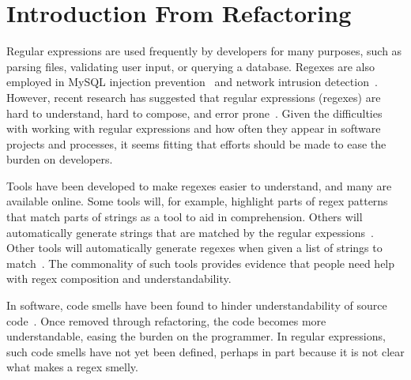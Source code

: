 \section{Introduction From Refactoring}

Regular expressions are used frequently by developers for many purposes, such as parsing files, validating user input, or querying a database.
Regexes are also employed in MySQL injection prevention~\cite{Yeole:2011:ADT:1980022.1980229} and network intrusion detection~\cite{network}.
However, recent research has suggested that regular expressions (regexes) are hard to understand, hard to compose, and error prone~\cite{Spishak:2012:TSR:2318202.2318207}.
Given the difficulties with working with regular expressions and how often they appear in software projects and processes, it seems fitting that efforts should be made to ease the burden on developers.

Tools have been developed to make regexes easier to understand, and many are available online.
Some tools will, for example, highlight parts of regex patterns that match parts of strings as a tool to aid in comprehension.
Others will automatically generate strings that are matched by the regular expessions~\cite{hampi}.
Other tools will automatically generate regexes when given a list of strings to match~\cite{Babbar:2010:CBA:1871840.1871848, Li:2008:REL:1613715.1613719}.
The commonality of such tools provides evidence that people need help with regex composition and understandability.

In software, code smells have been found to hinder understandability of source code~\cite{abbes2011empirical, du2006does}.
Once removed through refactoring, the code becomes more understandable, easing the burden on the programmer.
In regular expressions, such code smells have not yet been defined, perhaps in part because it is not clear what makes a regex smelly.





